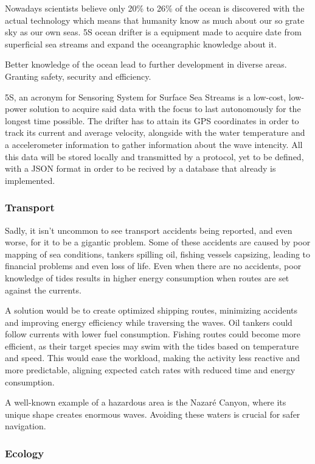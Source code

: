 Nowadays scientists believe only 20\% to 26\% of the ocean is discovered with the actual technology which means that humanity 
know as much about our so grate sky as our own seas. 5S ocean drifter is a equipment made to acquire date from 
superficial sea streams and expand the oceangraphic knowledge about it.

Better knowledge of the ocean lead to further development in diverse areas. Granting safety,
security and efficiency.

5S, an acronym for Sensoring System for Surface Sea Streams is a low-cost, low-power solution to acquire
said data with the focus to last autonomously for the longest time possible. The drifter has to attain its GPS
coordinates in order to track its current and average velocity, alongside with the water temperature and a accelerometer 
information to gather information about the wave intencity. All this data will be stored locally and transmitted by a protocol,
yet to be defined, with a JSON format in order to be recived by a database that already is implemented.  


\subsubsection{Transport}
Sadly, it isn't uncommon to see transport accidents being reported, and even worse, for it to be a gigantic problem.
Some of these accidents are caused by poor mapping of sea conditions, tankers spilling oil, fishing vessels capsizing, leading
to financial problems and even loss of life. Even when there are no accidents, poor knowledge of tides results in higher energy consumption when routes are set against the currents.

A solution would be to create optimized shipping routes, minimizing accidents and improving energy efficiency while 
traversing the waves. Oil tankers could follow currents with lower fuel consumption. Fishing routes could become more
efficient, as their target species may swim with the tides based on temperature and speed. This would ease the workload,
making the activity less reactive and more predictable, aligning expected catch rates with reduced time and energy 
consumption.

A well-known example of a hazardous area is the Nazaré Canyon, where its unique shape creates enormous waves. 
Avoiding these waters is crucial for safer navigation.

\subsubsection{Ecology}


